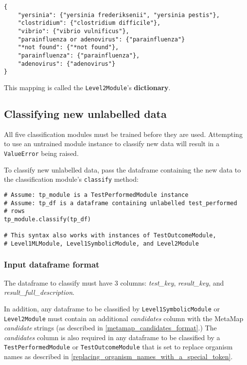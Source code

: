 \documentclass[a4paper]{article}
\begin{document}
\lstset{language=}
\begin{lstlisting}
{
    "yersinia": {"yersinia frederiksenii", "yersinia pestis"},
    "clostridium": {"clostridium difficile"},
    "vibrio": {"vibrio vulnificus"},
    "parainfluenza or adenovirus": {"parainfluenza"}
    "*not found": {"*not found"},
    "parainfluenza": {"parainfluenza"},
    "adenovirus": {"adenovirus"}
}
\end{lstlisting}
\lstset{language=}

This mapping is called the \lstinline{Level2Module}'s \textbf{dictionary}.

\subsection{Classifying new unlabelled data} \label{classifying_new_unlabelled_data}

All five classification modules must be trained before they are used. Attempting to use an untrained module instance to classify new data will result in a \lstinline{ValueError} being raised.

To classify new unlabelled data, pass the dataframe containing the new data to the classification module's \lstinline{classify} method:

\lstset{language=Python}
\begin{lstlisting}
# Assume: tp_module is a TestPerformedModule instance
# Assume: tp_df is a dataframe containing unlabelled test_performed
# rows
tp_module.classify(tp_df)

# This syntax also works with instances of TestOutcomeModule,
# Level1MLModule, Level1SymbolicModule, and Level2Module
\end{lstlisting}
\lstset{language=}

\subsubsection{Input dataframe format}

The dataframe to classify must have 3 columns: \textit{test\_key}, \textit{result\_key}, and \textit{result\_full\_description}.

In addition, any dataframe to be classified by \lstinline{Level1SymbolicModule} or \lstinline{Level2Module} must contain an additional \textit{candidates} column with the MetaMap \textit{candidate} strings (as described in \ref{metamap_candidates_format}.) The \textit{candidates} column is also required in any dataframe to be classified by a \lstinline{TestPerformedModule} or \lstinline{TestOutcomeModule} that is set to replace organism names as described in \ref{replacing_organism_names_with_a_special_token}.
\end{document}
